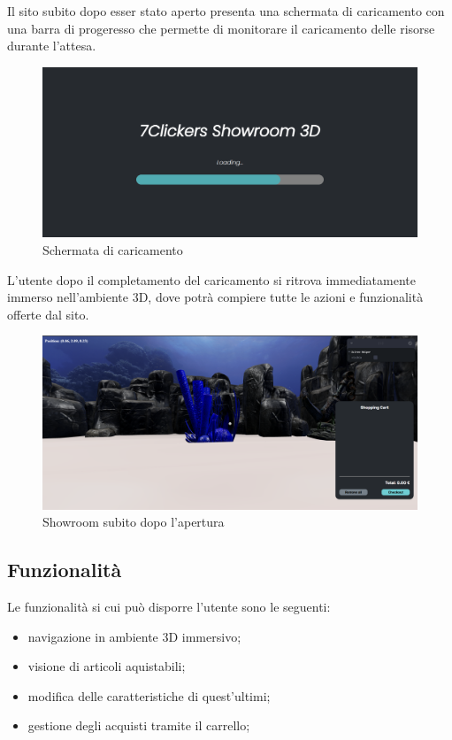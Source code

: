 Il sito subito dopo esser stato aperto presenta una schermata di caricamento con una barra di progeresso che permette di monitorare il caricamento delle risorse durante l'attesa.
\begin{figure}[H]
  \renewcommand{\thefigure}{1}
  \includegraphics[width=\linewidth]{./res/images/loading_screen.png}
  \caption{Schermata di caricamento}
  \label{Schermata di caricamento}
\end{figure}
L'utente dopo il completamento del caricamento si ritrova immediatamente immerso nell'ambiente 3D, dove potrà compiere tutte le azioni e funzionalità offerte dal sito. 
\begin{figure}[H]
  \renewcommand{\thefigure}{2}
  \includegraphics[width=\linewidth]{./res/images/schermata_iniziale.png}
  \caption{Showroom subito dopo l'apertura}
  \label{Showroom subito dopo l'apertura}
\end{figure}
\pagebreak

\subsection{Funzionalità}
Le funzionalità si cui può disporre l'utente sono le seguenti:
\begin{itemize}
\item navigazione in ambiente 3D immersivo;
\item visione di articoli aquistabili;
\item modifica delle caratteristiche di quest'ultimi;
\item gestione degli acquisti tramite il carrello;
\end{itemize}

